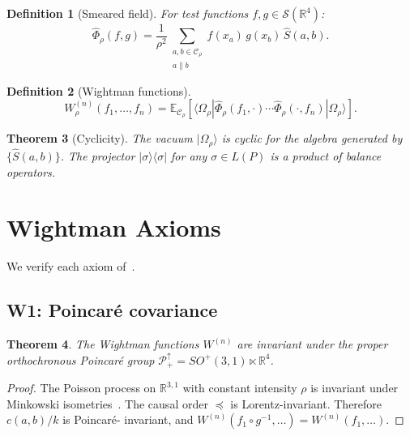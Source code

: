 \documentclass[11pt]{article}
\newtheorem{theorem}{Theorem}[section]
\newtheorem{definition}[theorem]{Definition}
\newcommand{\expect}{\mathbb{E}}
\newcommand{\schwartz}{\mathcal{S}}
\begin{document}
\begin{definition}[Smeared field]
For test functions $f, g \in \schwartz(\mathbb{R}^4)$:
\[
  \hat{\Phi}_\rho(f, g) =
  \frac{1}{\rho^2}
  \sum_{\substack{a, b \in \mathcal{C}_\rho \\ a \parallel b}}
  f(x_a)\, g(x_b)\, \hat{S}(a,b).
\]
\end{definition}

\begin{definition}[Wightman functions]
\[
  W^{(n)}_\rho(f_1, \ldots, f_n) =
  \expect_{\mathcal{C}_\rho}\!\left[
  \langle\Omega_\rho|
  \hat{\Phi}_\rho(f_1, \cdot) \cdots
  \hat{\Phi}_\rho(\cdot, f_n)
  |\Omega_\rho\rangle
  \right].
\]
\end{definition}

\begin{theorem}[Cyclicity]
\label{thm:cyclic}
The vacuum $|\Omega_\rho\rangle$ is cyclic for the algebra
generated by $\{\hat{S}(a,b)\}$.  The projector
$|\sigma\rangle\langle\sigma|$ for any $\sigma \in L(P)$
is a product of balance operators.
\end{theorem}

\section{Wightman Axioms}
\label{sec:wightman}

We verify each axiom of~\cite{SW64}.

\subsection{W1: Poincar\'e covariance}

\begin{theorem}
The Wightman functions $W^{(n)}$ are invariant under the
proper orthochronous Poincar\'e group
$\mathcal{P}^\uparrow_+ = SO^+(3,1) \ltimes \mathbb{R}^4$.
\end{theorem}

\begin{proof}
The Poisson process on $\mathbb{R}^{3,1}$ with constant
intensity $\rho$ is invariant under Minkowski
isometries~\cite{BLMS87}.  The causal order $\preceq$ is
Lorentz-invariant.  Therefore $c(a,b)/k$ is Poincar\'e-%
invariant, and
$W^{(n)}(f_1 \circ g^{-1}, \ldots) = W^{(n)}(f_1, \ldots)$.
\end{proof}
\end{document}
